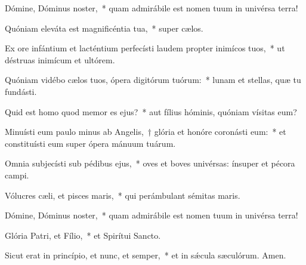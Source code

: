 \item Dómine, Dóminus noster,~* quam admirábile est nomen tuum in univérsa terra!

\item Quóniam eleváta est magnificéntia tua,~* super cælos.

\item Ex ore infántium et lacténtium perfecísti laudem propter inimícos tuos,~* ut déstruas inimícum et ultórem.

\item Quóniam vidébo cælos tuos, ópera digitórum tuórum:~* lunam et stellas, quæ tu fundásti.

\item Quid est homo quod memor es ejus?~* aut fílius hóminis, quóniam vísitas eum?

\item Minuísti eum paulo minus ab Angelis,~† glória et honóre coronásti eum:~* et constituísti eum super ópera mánuum tuárum.

\item Omnia subjecísti sub pédibus ejus,~* oves et boves univérsas: ínsuper et pécora campi.

\item Vólucres cæli, et pisces maris,~* qui perámbulant sémitas maris.

\item Dómine, Dóminus noster,~* quam admirábile est nomen tuum in univérsa terra!

\item Glória Patri, et Fílio,~* et Spirítui Sancto.

\item Sicut erat in princípio, et nunc, et semper,~* et in sǽcula sæculórum. Amen.

